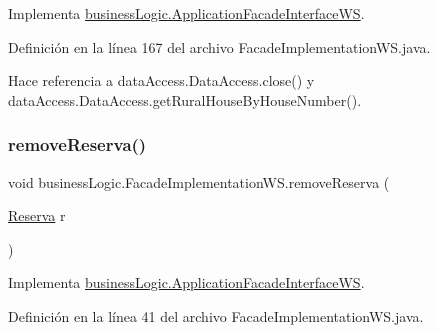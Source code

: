 Implementa \mbox{\hyperlink{interfacebusiness_logic_1_1_application_facade_interface_w_s_a686ca441b89f52085ef66d00f10c6854}{business\+Logic.\+Application\+Facade\+Interface\+WS}}.



Definición en la línea 167 del archivo Facade\+Implementation\+W\+S.\+java.


\begin{DoxyCode}{0}

\end{DoxyCode}


Hace referencia a data\+Access.\+Data\+Access.\+close() y data\+Access.\+Data\+Access.\+get\+Rural\+House\+By\+House\+Number().

\mbox{\label{classbusiness_logic_1_1_facade_implementation_w_s_ae4cb91caac6aed10801d61b70702fd30}} 
\subsubsection{\texorpdfstring{removeReserva()}{removeReserva()}}
{\footnotesize\ttfamily void business\+Logic.\+Facade\+Implementation\+W\+S.\+remove\+Reserva (\begin{DoxyParamCaption}\item[{\mbox{\hyperlink{classdomain_1_1_reserva}{Reserva}}}]{r }\end{DoxyParamCaption})}



Implementa \mbox{\hyperlink{interfacebusiness_logic_1_1_application_facade_interface_w_s_a0c4ed4fa98351e6aaba6f9769e561abf}{business\+Logic.\+Application\+Facade\+Interface\+WS}}.



Definición en la línea 41 del archivo Facade\+Implementation\+W\+S.\+java.


